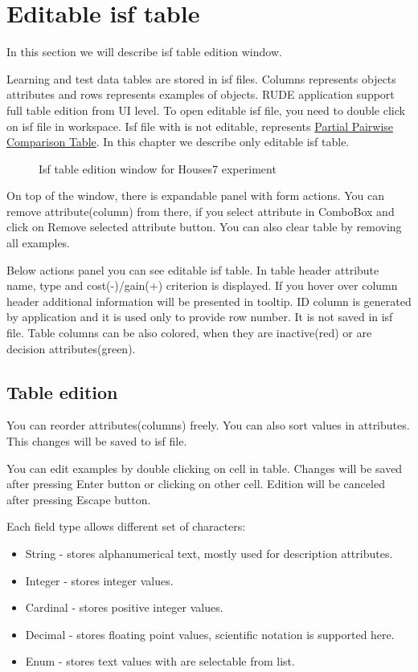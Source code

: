 \section{Editable isf table}\label{section:isf-table}

In this section we will describe isf table edition window.

Learning and test data tables are stored in isf files. Columns represents objects attributes and rows represents examples of objects. RUDE application support full table edition from UI level. To open editable isf file, you need to double click on isf file in workspace. Isf file with is not editable, represents \hyperref[sub:pct-isf]{Partial Pairwise Comparison Table}. In this chapter we describe only editable isf table.

\begin{figure*}[!ht] 
	\centering
	\caption{Isf table edition window for Houses7 experiment}
\end{figure*}

On top of the window, there is expandable panel with form actions.
You can remove attribute(column) from there, if you select attribute in ComboBox and click on Remove selected attribute button. You can also clear table by removing all examples.

Below actions panel you can see editable isf table. In table header attribute name, type and cost(-)/gain(+) criterion is displayed. If you hover over column header additional information will be presented in tooltip. ID column is generated by application and it is used only to provide row number. It is not saved in isf file. Table columns can be also colored, when they are inactive(red) or are decision attributes(green).

\subsection{Table edition}\label{sub:isf-examples}

You can reorder attributes(columns) freely. You can also sort values in attributes. This changes will be saved to isf file.

You can edit examples by double clicking on cell in table. Changes will be saved after pressing Enter button or clicking on other cell. Edition will be canceled after pressing Escape button.

Each field type allows different set of characters:
\begin{itemize}
	\item String - stores alphanumerical text, mostly used for description attributes.
	\item Integer - stores integer values.
	\item Cardinal - stores positive integer values.
	\item Decimal - stores floating point values, scientific notation is supported here.
	\item Enum - stores text values with are selectable from list.
\end{itemize}

